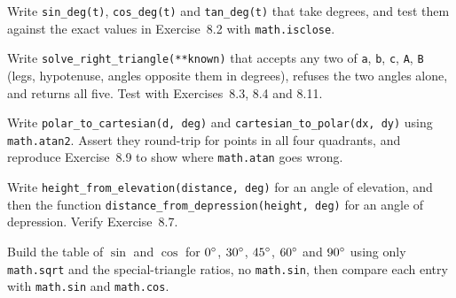 \begin{codeexercises}
\item Write \lstinline!sin_deg(t)!, \lstinline!cos_deg(t)! and \lstinline!tan_deg(t)! that take degrees, and test them against the exact values in Exercise~8.2 with \lstinline!math.isclose!.
\item Write \lstinline!solve_right_triangle(**known)! that accepts any two of \lstinline!a!, \lstinline!b!, \lstinline!c!, \lstinline!A!, \lstinline!B! (legs, hypotenuse, angles opposite them in degrees), refuses the two angles alone, and returns all five. Test with Exercises~8.3, 8.4 and 8.11.
\item Write \lstinline!polar_to_cartesian(d, deg)! and \lstinline!cartesian_to_polar(dx, dy)! using \lstinline!math.atan2!. Assert they round-trip for points in all four quadrants, and reproduce Exercise~8.9 to show where \lstinline!math.atan! goes wrong.
\item Write \lstinline!height_from_elevation(distance, deg)! for an angle of elevation, and then the function \lstinline!distance_from_depression(height, deg)! for an angle of depression. Verify Exercise~8.7.
\item Build the table of $\sin$ and $\cos$ for $0^\circ$, $30^\circ$, $45^\circ$, $60^\circ$ and $90^\circ$ using only \lstinline!math.sqrt! and the special-triangle ratios, no \lstinline!math.sin!, then compare each entry with \lstinline!math.sin! and \lstinline!math.cos!.
\end{codeexercises}
